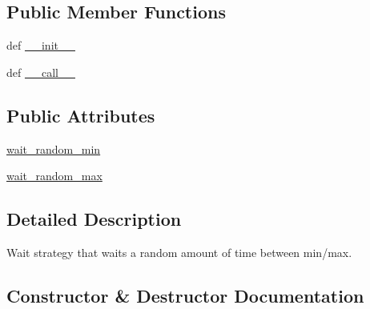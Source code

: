 \subsection*{Public Member Functions}
\begin{DoxyCompactItemize}
\item 
def \hyperlink{classpip_1_1__vendor_1_1tenacity_1_1wait_1_1wait__random_abef5d5ecf5b2668d828e4856137981fe}{\+\_\+\+\_\+init\+\_\+\+\_\+}
\item 
def \hyperlink{classpip_1_1__vendor_1_1tenacity_1_1wait_1_1wait__random_a3f07471a4ea187cc589b3b792e2c5a78}{\+\_\+\+\_\+call\+\_\+\+\_\+}
\end{DoxyCompactItemize}
\subsection*{Public Attributes}
\begin{DoxyCompactItemize}
\item 
\hyperlink{classpip_1_1__vendor_1_1tenacity_1_1wait_1_1wait__random_a50687544554fab2de2d832021d0770c6}{wait\+\_\+random\+\_\+min}
\item 
\hyperlink{classpip_1_1__vendor_1_1tenacity_1_1wait_1_1wait__random_a0af2dded4c525c383cdb4fee7dc53d7e}{wait\+\_\+random\+\_\+max}
\end{DoxyCompactItemize}


\subsection{Detailed Description}
\begin{DoxyVerb}Wait strategy that waits a random amount of time between min/max.\end{DoxyVerb}
 

\subsection{Constructor \& Destructor Documentation}
\mbox{\label{classpip_1_1__vendor_1_1tenacity_1_1wait_1_1wait__random_abef5d5ecf5b2668d828e4856137981fe}} 
